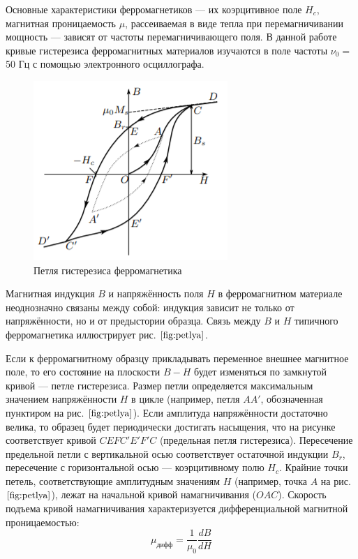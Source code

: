 \documentclass[12pt,a4paper]{article}
\begin{document}
Основные характеристики
ферромагнетиков — их коэрцитивное поле $H_c$, магнитная проницаемость
$\mu$, рассеиваемая в виде тепла при перемагничивании мощность — зависят
от частоты перемагничивающего поля. В данной работе кривые гистерезиса ферромагнитных материалов изучаются в поле частоты $\nu_0 =$ 50 Гц
с помощью электронного осциллографа.
\begin{figure}[h]
	\centering
	\includegraphics[scale=0.7]{petlya.png}
	\caption{Петля гистерезиса ферромагнетика}
	\label{fig:petlya}
\end{figure}

Магнитная индукция $ B $ и напряжённость поля $ H $ в ферромагнитном материале неоднозначно связаны между собой: индукция зависит
не только от напряжённости, но и от предыстории образца. Связь между $ B $ и $ H $ типичного ферромагнетика иллюстрирует рис. $\ref{fig:petlya}$.

Если к ферромагнитному образцу прикладывать переменное внешнее
магнитное поле, то его состояние на плоскости $ B-H $ будет изменяться
по замкнутой кривой — петле гистерезиса. Размер петли определяется
максимальным значением напряжённости $ H $ в цикле (например, петля $ AA' $,
обозначенная пунктиром на рис. $\ref{fig:petlya}$). Если амплитуда напряжённости достаточно велика, то образец будет периодически достигать насыщения,
что на рисунке соответствует кривой $ CEFC'E'F'C $ (предельная петля
гистерезиса). Пересечение предельной петли с вертикальной осью соответствует остаточной индукции $B_r$, пересечение с горизонтальной осью
— коэрцитивному полю $H_c$. Крайние точки петель, соответствующие амплитудным значениям $ H $ (например, точка $ A $ на рис. $\ref{fig:petlya}$), лежат на начальной кривой намагничивания ($ OAC $). Скорость подъема кривой намагничивания характеризуется дифференциальной магнитной проницаемостью:
\begin{equation}
\mu_{дифф} = \frac{1}{\mu_0} \frac{dB}{dH}
\label{equation_going_up}
\end{equation}
\end{document}
